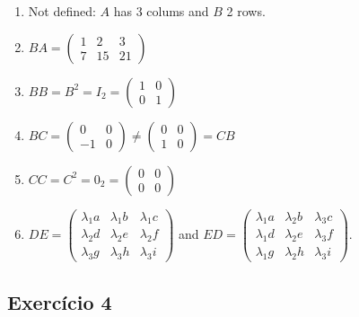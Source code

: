 \begin{enumerate}
\item Not defined: $A$ has 3 colums and $B$ 2 rows.
\item $BA = \begin{pmatrix}
  1 & 2 & 3 \\
  7 & 15 & 21
\end{pmatrix}$
\item $BB = B^2 = I_2 = \begin{pmatrix}
  1 & 0 \\
  0 & 1\end{pmatrix}$
\item $BC = \begin{pmatrix}
  0 & 0 \\
  -1 & 0\end{pmatrix} \neq \begin{pmatrix}
  0 & 0 \\
  1 & 0\end{pmatrix} = CB$
\item $CC = C^2 = 0_2 = \begin{pmatrix}
  0 & 0 \\
  0 & 0\end{pmatrix}$

\item $DE =
  \begin{pmatrix}
  \lambda_1 a & \lambda_1 b & \lambda_1  c \\
  \lambda_2 d & \lambda_2 e & \lambda_2 f  \\
  \lambda_3 g & \lambda_3 h & \lambda_3 i  \end{pmatrix}$
  and
  $ED =
  \begin{pmatrix}
  \lambda_1 a & \lambda_2 b & \lambda_3  c \\
  \lambda_1 d & \lambda_2 e & \lambda_3 f  \\
  \lambda_1 g & \lambda_2 h & \lambda_3 i  \end{pmatrix}$.
\end{enumerate}


\subsection*{Exercício 4}

